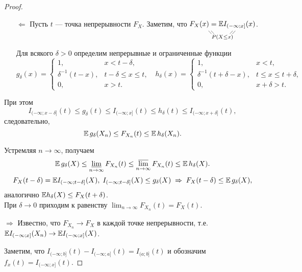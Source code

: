 \begin{proof}
    \begin{itemize}
        \item[$\Leftarrow$] Пусть $t$ --- точка непрерывности $F_X$. Заметим, что 
        $\underset{\overset{\diagdown\!\!\diagdown \ \ \ \ \ \ \diagup\!\!\diagup}{P(X \le x)}}{F_X(x) = \EE I_{(-\infty; x]}(x)}$.
        
        Для всякого $\delta > 0$ определим непрерывные и ограниченные функции
        \[ g_{\delta}(x) = 
        \left\{\begin{array}{ll} 
        1, & x < t - \delta, \\ 
        \delta^{-1}(t - x), & t - \delta \le x \le t, \\ 
        0, & x > t. 
        \end{array}\right. \ \ \  h_{\delta}(x) = 
        \left\{\begin{array}{ll} 
        1, & x < t, \\ 
        \delta^{-1}(t + \delta - x), & t \le x \le t + \delta, \\ 
        0, & x + \delta > t. 
        \end{array}\right. \]
    \end{itemize}
    При этом 
    \[ I_{(-\infty; x - \delta]}(t) \le g_{\delta}(t) \le  I_{(-\infty; x]}(t) \le h_{\delta}(t) \le I_{(-\infty; x + \delta]}(t), \]
    следовательно, 
    \[ \mathbb{E}\,g_{\delta}(X_n) \le F_{X_n}(t) \le \mathbb{E}\,h_{\delta}(X_n). \]
    
    Устремляя $n \to \infty$, получаем
    \[ \mathbb{E}\,g_{\delta}(X) \le \varliminf_{n \to \infty} F_{X_n}(t) \le \varlimsup_{n \to \infty} F_{X_n}(t) \le \mathbb{E}\,h_{\delta}(X). \]
    \[ F_X(t - \delta) = \mathbb{E} I_{(-\infty; t - \delta]}(X), \; I_{(-\infty; t - \delta]}(X) \le g_{\delta}(X) \;\Rightarrow\; F_X(t - \delta) \le \mathbb{E}\,g_{\delta}(X), \]
    аналогично $\mathbb{E} h_{\delta}(X) \le F_X(t + \delta)$. \\
    
    При $\delta \to 0$ приходим к равенству $\lim_{n \to \infty} F_{X_n}(t) = F_X(t)$. \\
    
    \item[$\Rightarrow$] Известно, что $F_{X_n} \to F_X$ в каждой точке непрерывности, т.е. 
    $\mathbb{E} I_{(-\infty;x]}(X_n) \to \mathbb{E} I_{(-\infty;x]}(X)$.
    
    Заметим, что $I_{(-\infty;b]}(t) - I_{(-\infty;a]}(t) = I_{(a;b]}(t)$ и обозначим $f_x(t) = I_{(-\infty;x]}(t)$. 
    

\end{proof}
